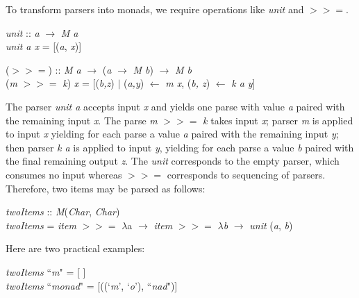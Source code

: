 \documentclass{article}
\begin{document}
   To transform parsers into monads, we require operations like \textit{unit} and $>>=$.
   
   \begin{center}
       \textit{unit} :: \textit{a} $\rightarrow$ \textit{M a} \\
       \textit{unit a x} = [(\textit{a}, \textit{x})] \\
   \end{center}
   
   \begin{center}
       ($>>=$) :: \textit{M a} $\rightarrow$ (\textit{a} $\rightarrow$ \textit{M b}) $\rightarrow$ \textit{M b} \\
       (\textit{m} $>>=$ \textit{k}) \textit{x} = [(\textit{b,z}) $|$ (\textit{a,y}) $\leftarrow$ \textit{m x}, (\textit{b, z}) $\leftarrow$ \textit{k a y}]
   \end{center}
   
   The parser \textit{unit a} accepts input \textit{x} and yields one parse with value \textit{a} paired with the remaining input \textit{x}. 
   The parse \textit{m} $>>=$ \textit{k} takes input \textit{x}; parser \textit{m} is applied to input \textit{x} yielding for each parse a value \textit{a} paired with the remaining input \textit{y}; then parser \textit{k a} is applied to input \textit{y}, yielding for each parse a value \textit{b} paired with the final remaining output \textit{z}. 
   The \textit{unit} corresponds to the empty parser, which consumes no input whereas \textit{$>>=$} corresponds to sequencing of parsers. 
   Therefore, two items may be parsed as follows: 
   
   \begin{center}
       \textit{twoItems} :: \textit{M}(\textit{Char}, \textit{Char}) \\
       \textit{twoItems} = \textit{item} $>>=$ $\lambda$a $\rightarrow$ \textit{item} $>>=$ $\lambda$\textit{b} $\rightarrow$ \textit{unit} (\textit{a}, \textit{b})

   \end{center}
   
   Here are two practical examples:
   
   \begin{center}
       \textit{twoItems} ``\textit{m}" = [ ] \\
       \textit{twoItems} ``\textit{monad}" = [((`\textit{m}', `\textit{o}'), ``\textit{nad}")]
   \end{center}
   
     
     
  
\end{document}
